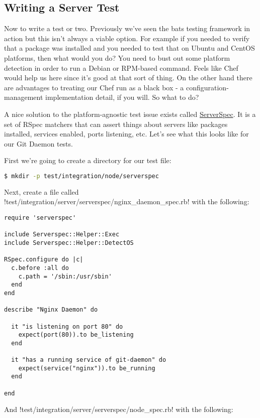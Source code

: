 \subsection{Writing a Server Test}

Now to write a test or two. Previously we've seen the bats testing framework in action but this isn't always a viable option. For example if you needed to verify that a package was installed and you needed to test that on Ubuntu and CentOS platforms, then what would you do? You need to bust out some platform detection in order to run a Debian or RPM-based command. Feels like Chef would help us here since it's good at that sort of thing. On the other hand there are advantages to treating our Chef run as a black box - a configuration-management implementation detail, if you will. So what to do?

A nice solution to the platform-agnostic test issue exists called \href{http://serverspec.org/}{ServerSpec}. It is a set of RSpec matchers that can assert things about servers like packages installed, services enabled, ports listening, etc. Let's see what this looks like for our Git Daemon tests.

First we're going to create a directory for our test file:

\begin{lstlisting}[language=Bash,label=lst:testing-test-kitchen36]
$ mkdir -p test/integration/node/serverspec
\end{lstlisting}

Next, create a file called \inline!test/integration/server/serverspec/nginx_daemon_spec.rb! with the following:

\begin{lstlisting}[label=lst:testing-test-kitchen37]
require 'serverspec'

include Serverspec::Helper::Exec
include Serverspec::Helper::DetectOS

RSpec.configure do |c|
  c.before :all do
    c.path = '/sbin:/usr/sbin'
  end
end

describe "Nginx Daemon" do

  it "is listening on port 80" do
    expect(port(80)).to be_listening
  end

  it "has a running service of git-daemon" do
    expect(service("nginx")).to be_running
  end

end
\end{lstlisting}

And \inline!test/integration/server/serverspec/node_spec.rb! with the following:

